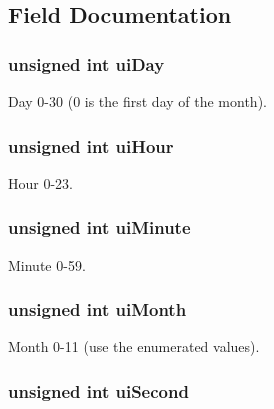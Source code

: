 \subsection{Field Documentation}
\subsubsection[{uiDay}]{\setlength{\rightskip}{0pt plus 5cm}unsigned int {\bf uiDay}}\label{struct_r_t_c___s_t_r_u_c_t_a1b4d1cf4f0bd6ecf1cfa915436fc01a5}


Day 0-\/30 (0 is the first day of the month). 
\subsubsection[{uiHour}]{\setlength{\rightskip}{0pt plus 5cm}unsigned int {\bf uiHour}}\label{struct_r_t_c___s_t_r_u_c_t_ab1f7e6de02b5e9ff95c6d4eac37b85a8}


Hour 0-\/23. 
\subsubsection[{uiMinute}]{\setlength{\rightskip}{0pt plus 5cm}unsigned int {\bf uiMinute}}\label{struct_r_t_c___s_t_r_u_c_t_a7f41a67286efd5b00d7e05e3e8a279e5}


Minute 0-\/59. 
\subsubsection[{uiMonth}]{\setlength{\rightskip}{0pt plus 5cm}unsigned int {\bf uiMonth}}\label{struct_r_t_c___s_t_r_u_c_t_a202eede30fbd3a5d07e244622c50aacb}


Month 0-\/11 (use the enumerated values). 
\subsubsection[{uiSecond}]{\setlength{\rightskip}{0pt plus 5cm}unsigned int {\bf uiSecond}}\label{struct_r_t_c___s_t_r_u_c_t_acffcb37a219959d997749eb845c728dc}


